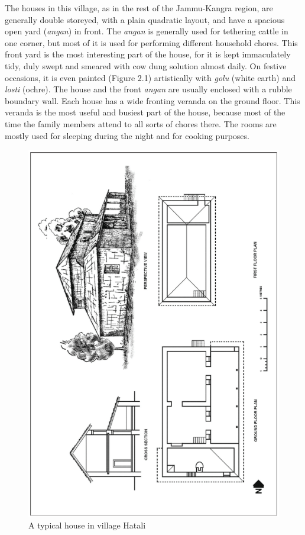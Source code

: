 The houses in this village, as in the rest of the Jammu-Kangra region, are generally double storeyed, with a plain quadratic layout, and have a spacious open yard (\textit{angan}) in front. The \textit{angan} is generally used for tethering cattle in one corner, but most of it is used for performing different household chores. This front yard is the most interesting part of the house, for it is kept immaculately tidy, duly swept and smeared with cow dung solution almost daily. On festive occasions, it is even painted (Figure 2.1) artistically with \textit{golu} (white earth) and \textit{losti} (ochre). The house and the front \textit{angan} are usually enclosed with a rubble boundary wall. Each house has a wide fronting veranda on the ground floor. This veranda is the most useful and busiest part of the house, because most of the time the family members attend to all sorts of chores there. The rooms are mostly used for sleeping during the night and for cooking purposes.

\begin{figure}[!htbp]
\includegraphics{images/chap02-01.jpg}
\caption{A typical house in village Hatali}\label{chap02-fig01}
\end{figure}

